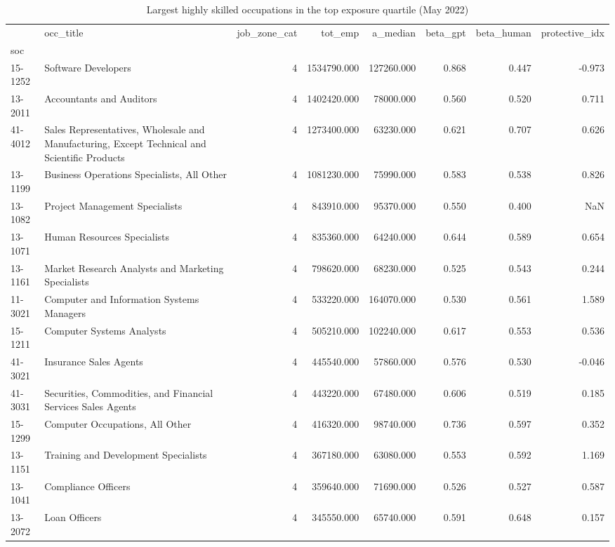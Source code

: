 \begin{table}
\caption{Largest highly skilled occupations in the top exposure quartile (May 2022)}
\label{tab:table3_exposed_professions}
\begin{tabular}{llrrrrrr}
\toprule
 & occ\_title & job\_zone\_cat & tot\_emp & a\_median & beta\_gpt & beta\_human & protective\_idx \\
soc &  &  &  &  &  &  &  \\
\midrule
15-1252 & Software Developers & 4 & 1534790.000 & 127260.000 & 0.868 & 0.447 & -0.973 \\
13-2011 & Accountants and Auditors & 4 & 1402420.000 & 78000.000 & 0.560 & 0.520 & 0.711 \\
41-4012 & Sales Representatives, Wholesale and Manufacturing, Except Technical and Scientific Products & 4 & 1273400.000 & 63230.000 & 0.621 & 0.707 & 0.626 \\
13-1199 & Business Operations Specialists, All Other & 4 & 1081230.000 & 75990.000 & 0.583 & 0.538 & 0.826 \\
13-1082 & Project Management Specialists & 4 & 843910.000 & 95370.000 & 0.550 & 0.400 & NaN \\
13-1071 & Human Resources Specialists & 4 & 835360.000 & 64240.000 & 0.644 & 0.589 & 0.654 \\
13-1161 & Market Research Analysts and Marketing Specialists & 4 & 798620.000 & 68230.000 & 0.525 & 0.543 & 0.244 \\
11-3021 & Computer and Information Systems Managers & 4 & 533220.000 & 164070.000 & 0.530 & 0.561 & 1.589 \\
15-1211 & Computer Systems Analysts & 4 & 505210.000 & 102240.000 & 0.617 & 0.553 & 0.536 \\
41-3021 & Insurance Sales Agents & 4 & 445540.000 & 57860.000 & 0.576 & 0.530 & -0.046 \\
41-3031 & Securities, Commodities, and Financial Services Sales Agents & 4 & 443220.000 & 67480.000 & 0.606 & 0.519 & 0.185 \\
15-1299 & Computer Occupations, All Other & 4 & 416320.000 & 98740.000 & 0.736 & 0.597 & 0.352 \\
13-1151 & Training and Development Specialists & 4 & 367180.000 & 63080.000 & 0.553 & 0.592 & 1.169 \\
13-1041 & Compliance Officers & 4 & 359640.000 & 71690.000 & 0.526 & 0.527 & 0.587 \\
13-2072 & Loan Officers & 4 & 345550.000 & 65740.000 & 0.591 & 0.648 & 0.157 \\

\end{tabular}
\end{table}
